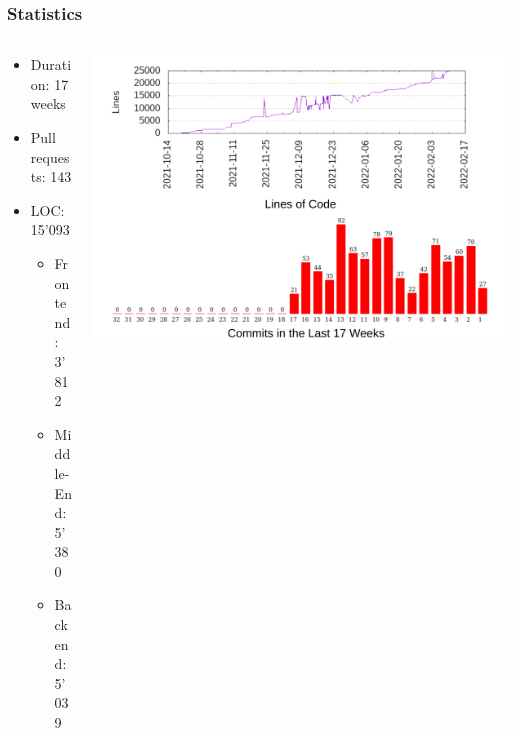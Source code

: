 \documentclass[navbaroff,en]{sdqbeamer}
\begin{document}
\begin{frame}
	\frametitle{Statistics}

	\begin{columns}
		\begin{column}{0.3\textwidth}
			\begin{itemize}
				\item Duration: 17 weeks
				\item Pull requests: 143
				\item LOC: 15'093
				      \begin{itemize}
					      \item Frontend: 3'812
					      \item Middle-End: 5'380
					      \item Backend: 5'039
				      \end{itemize}
			\end{itemize}
		\end{column}

		\begin{column}{0.7\textwidth}
			\centering \includegraphics[scale=0.43]{images/stats.pdf}
		\end{column}

	\end{columns}


\end{frame}



\end{document}
